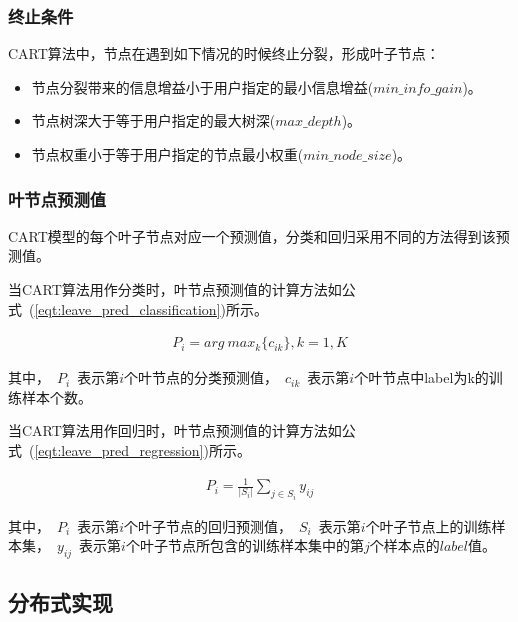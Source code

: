 \documentclass[a4paper,11pt,         %
               ]{article}
\begin{document}
\subsubsection{终止条件}

CART算法中，节点在遇到如下情况的时候终止分裂，形成叶子节点：

\begin{itemize}
\item 节点分裂带来的信息增益小于用户指定的最小信息增益($min\_info\_gain$)。
\item 节点树深大于等于用户指定的最大树深($max\_depth$)。
\item 节点权重小于等于用户指定的节点最小权重($min\_node\_size$)。
\end{itemize}

\subsubsection{叶节点预测值}

CART模型的每个叶子节点对应一个预测值，分类和回归采用不同的方法得到该预测值。 

当CART算法用作分类时，叶节点预测值的计算方法如公式~(\ref{eqt:leave_pred_classification})所示。

\begin{eqnarray}
  \label{eqt:leave_pred_classification}
P_{i} = arg~max_{k}\{c_{ik}\}, k = 1,K
\end{eqnarray}

其中，~$P_{i}$~表示第$i$个叶节点的分类预测值，~$c_{ik}$~表示第$i$个叶节点中label为k的训练样本个数。

当CART算法用作回归时，叶节点预测值的计算方法如公式~(\ref{eqt:leave_pred_regression})所示。

\begin{eqnarray}
	\label{eqt:leave_pred_regression}
P_{i} = \frac{1}{\left | S_{i} \right |} \sum_{j \in S_{i}} y_{ij}
\end{eqnarray}

其中，~$P_{i}$~表示第$i$个叶子节点的回归预测值，~$S_{i}$~表示第$i$个叶子节点上的训练样本集，~$y_{ij}$~表示第$i$个叶子节点所包含的训练样本集中的第$j$个样本点的$label$值。

\subsection{分布式实现}
\end{document}
